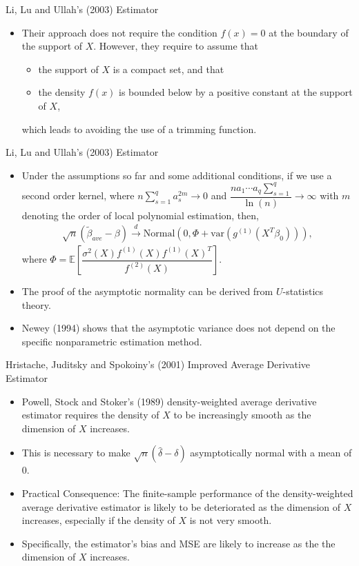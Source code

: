 \documentclass[xcolor=svgnames,dvipdfmx,cjk]{beamer}
\theoremstyle{example}
\def\var{\text{var}}
\def\E{\mathbb{E}}
\def\darrow{\xrightarrow{d}}
\begin{document}
\begin{frame}{Li, Lu and Ullah's (2003) Estimator}
\begin{itemize}
  \item Their approach does not require the condition $f(x)=0$ at the boundary of the support of $X$. 
        However, they require to assume that 
        \begin{itemize}
          \item the support of $X$ is a compact set, and that 
          \item the density $f(x)$ is bounded below by a positive constant at the support of $X$,
        \end{itemize}
        which leads to avoiding the use of a trimming function. 
\end{itemize}  
\end{frame}

\begin{frame}{Li, Lu and Ullah's (2003) Estimator}
\begin{itemize}
  \item Under the assumptions so far and some additional conditions, 
        if we use a second order kernel, 
        where $n\displaystyle\sum_{s=1}^{q} a_s^{2m} \to 0$ 
        and $\dfrac{n a_1 \cdots a_q \sum_{s=1}^{q}}{\ln (n)} \to \infty$ 
        with $m$ denoting the order of local polynomial estimation, then,
        \begin{align*}
          \sqrt{n} (\tilde{\beta}_{ave} - \beta) 
          \darrow \text{Normal}\left(0, \Phi + \var(g^{(1)}(X^{T}\beta_0)) \right),
        \end{align*} 
        where $\Phi = \E \left[ \dfrac{\sigma^2(X) f^{(1)}(X) f^{(1)}(X)^T}{f^{(2)}(X)} \right]$.
  \item The proof of the asymptotic normality can be derived from $U$-statistics theory.
  \item Newey (1994) shows that the asymptotic variance does not depend on the specific nonparametric estimation method.
\end{itemize}  
\end{frame}

\begin{frame}{Hristache, Juditsky and Spokoiny's (2001) Improved Average Derivative Estimator}
\begin{itemize}
  \item Powell, Stock and Stoker's (1989) density-weighted average derivative estimator requires 
        the density of $X$ to be increasingly smooth as the dimension of $X$ increases.
  \item This is necessary to make $\sqrt{n}(\hat{\delta} - \delta)$ asymptotically normal with a mean of 0.
  \item \alert{Practical Consequence}: The finite-sample performance of the density-weighted average derivative estimator
        is likely to be deteriorated as the dimension of $X$ increases, 
        especially if the density of $X$ is not very smooth.
  \item Specifically, the estimator's bias and MSE are likely to increase as the the dimension of $X$ increases.
\end{itemize}
\end{frame}
\end{document}
